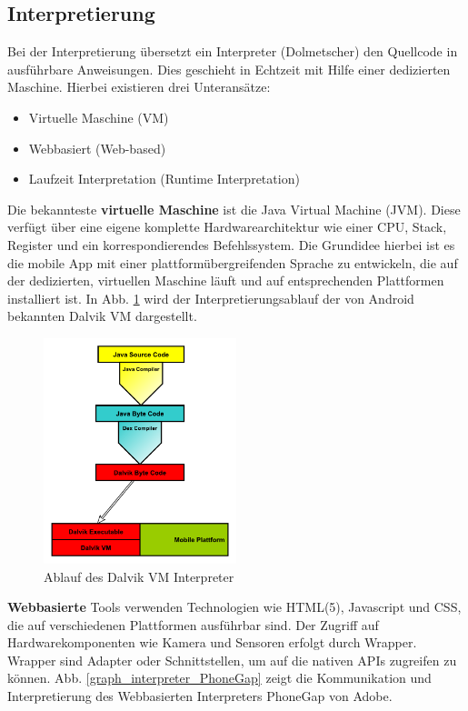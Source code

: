 \subsection{Interpretierung}
Bei der Interpretierung übersetzt ein Interpreter (Dolmetscher) den Quellcode in ausführbare Anweisungen. Dies geschieht in Echtzeit mit Hilfe einer dedizierten Maschine. Hierbei existieren drei Unteransätze:

\begin{itemize}
	\item Virtuelle Maschine (VM)
	\item Webbasiert (Web-based)
	\item Laufzeit Interpretation (Runtime Interpretation)
\end{itemize}

Die bekannteste \textbf{virtuelle Maschine} ist die Java Virtual Machine (JVM). Diese verfügt über eine eigene komplette Hardwarearchitektur wie einer CPU, Stack, Register und ein korrespondierendes Befehlssystem. Die Grundidee hierbei ist es die mobile App mit einer plattformübergreifenden Sprache zu entwickeln, die auf der dedizierten, virtuellen Maschine läuft und auf entsprechenden Plattformen installiert ist. In Abb. \ref{graph_interpreter_Dalvik} wird der Interpretierungsablauf der von Android bekannten Dalvik VM dargestellt.

\begin{figure}[htbp]
	\centering
	\includegraphics[width=0.5\textwidth]{Bilder/Interpretation_VM_Dalvik}
	\caption{Ablauf des Dalvik VM Interpreter}\label{graph_interpreter_Dalvik}
\end{figure}

\medskip
\textbf{Webbasierte} Tools verwenden Technologien wie HTML(5), Javascript und CSS, die auf verschiedenen Plattformen ausführbar sind. Der Zugriff auf Hardwarekomponenten wie Kamera und Sensoren erfolgt durch Wrapper. Wrapper sind Adapter oder Schnittstellen, um auf die nativen APIs zugreifen zu können. Abb. \ref{graph_interpreter_PhoneGap} zeigt die Kommunikation und Interpretierung des Webbasierten Interpreters PhoneGap von Adobe.

